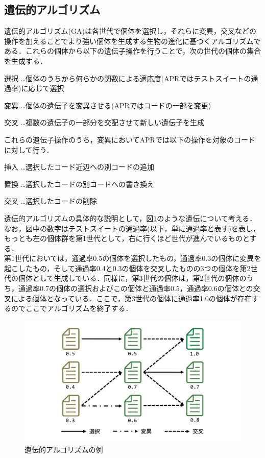 \documentclass[uplatex,dvipdfmx,a4paper]{jsarticle}
\begin{document}
\subsection{遺伝的アルゴリズム}\label{sec:ga}
遺伝的アルゴリズム(GA)は各世代で個体を選択し，それらに変異，交叉などの操作を加えることでより強い個体を生成する生物の進化に基づくアルゴリズムである．これらの個体から以下の遺伝子操作を行うことで，次の世代の個体の集合を生成する．
\begin{description}
\item{選択} …個体のうちから何らかの関数による適応度(APRではテストスイートの通過率)に応じて選択
\item{変異} …個体の遺伝子を変異させる(APRではコードの一部を変更)
\item{交叉} …複数の遺伝子の一部分を交配させて新しい遺伝子を生成
\end{description}
これらの遺伝子操作のうち，変異においてAPRでは以下の操作を対象のコードに対して行う．\\
\begin{description}
\item{挿入} …選択したコード近辺への別コードの追加
\item{置換} …選択したコードの別コードへの書き換え
\item{交叉} …選択したコードの削除
\end{description}
遺伝的アルゴリズムの具体的な説明として，図\ref{fig:ga}のような遺伝について考える．なお，図中の数字はテストスイートの通過率(以下，単に通過率と表す)を表し，もっとも左の個体群を第1世代として，右に行くほど世代が進んでいるものとする．\\
第1世代においては，通過率0.5の個体を選択したもの，通過率0.3の個体に変異を起こしたもの，そして通過率0.4と0.3の個体を交叉したものの3つの個体を第2世代の個体として生成している．同様に，第3世代の個体は，第2世代の個体のうち，通過率0.7の個体の選択およびこの個体と通過率0.5，通過率0.6の個体との交叉による個体となっている．ここで，第3世代の個体に通過率1.0の個体が存在するのでここでアルゴリズムを終了する．
\begin{figure}[t]
  \centering
  \includegraphics[width=\linewidth]{fig/ga.pdf}
  \caption{遺伝的アルゴリズムの例}
  \label{fig:ga}
\end{figure}
\end{document}
